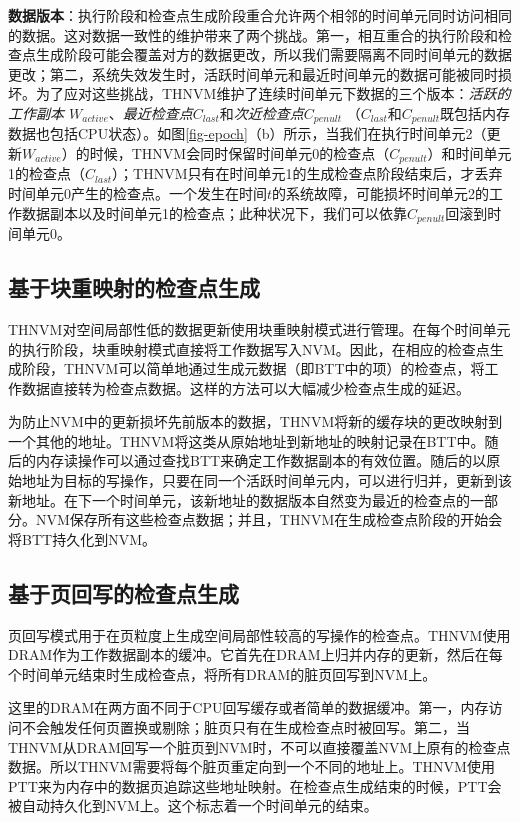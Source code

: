 \textbf{数据版本}：执行阶段和检查点生成阶段重合允许两个相邻的时间单元同时访问相同的数据。这对数据一致性的维护带来了两个挑战。第一，相互重合的执行阶段和检查点生成阶段可能会覆盖对方的数据更改，所以我们需要隔离不同时间单元的数据更改；第二，系统失效发生时，活跃时间单元和最近时间单元的数据可能被同时损坏。为了应对这些挑战，THNVM维护了连续时间单元下数据的三个版本：\emph{活跃的工作副本 $W_{active}$}、\emph{最近检查点$C_{last}$}和\emph{次近检查点$C_{penult}$} （$C_{last}$和$C_{penult}$既包括内存数据也包括CPU状态）。如图\ref{fig-epoch}（b）所示，当我们在执行时间单元2（更新$W_{active}$）的时候，THNVM会同时保留时间单元0的检查点（$C_{penult}$）和时间单元1的检查点（$C_{last}$）；THNVM只有在时间单元1的生成检查点阶段结束后，才丢弃时间单元0产生的检查点。一个发生在时间$t$的系统故障，可能损坏时间单元2的工作数据副本以及时间单元1的检查点；此种状况下，我们可以依靠$C_{penult}$回滚到时间单元0。

\subsection{基于块重映射的检查点生成}
\label{subsec:block-remap}

THNVM对空间局部性低的数据更新使用块重映射模式进行管理。在每个时间单元的执行阶段，块重映射模式直接将工作数据写入NVM。因此，在相应的检查点生成阶段，THNVM可以简单地通过生成元数据（即BTT中的项）的检查点，将工作数据直接转为检查点数据。这样的方法可以大幅减少检查点生成的延迟。

为防止NVM中的更新损坏先前版本的数据，THNVM将新的缓存块的更改映射到一个其他的地址。THNVM将这类从原始地址到新地址的映射记录在BTT中。随后的内存读操作可以通过查找BTT来确定工作数据副本的有效位置。随后的以原始地址为目标的写操作，只要在同一个活跃时间单元内，可以进行归并，更新到该新地址。在下一个时间单元，该新地址的数据版本自然变为最近的检查点的一部分。NVM保存所有这些检查点数据；并且，THNVM在生成检查点阶段的开始会将BTT持久化到NVM。

\subsection{基于页回写的检查点生成}
\label{subsec:page-writeback}

页回写模式用于在页粒度上生成空间局部性较高的写操作的检查点。THNVM使用DRAM作为工作数据副本的缓冲。它首先在DRAM上归并内存的更新，然后在每个时间单元结束时生成检查点，将所有DRAM的脏页回写到NVM上。

这里的DRAM在两方面不同于CPU回写缓存或者简单的数据缓冲。第一，内存访问不会触发任何页置换或剔除；脏页只有在生成检查点时被回写。第二，当THNVM从DRAM回写一个脏页到NVM时，不可以直接覆盖NVM上原有的检查点数据。所以THNVM需要将每个脏页重定向到一个不同的地址上。THNVM使用PTT来为内存中的数据页追踪这些地址映射。在检查点生成结束的时候，PTT会被自动持久化到NVM上。这个标志着一个时间单元的结束。

